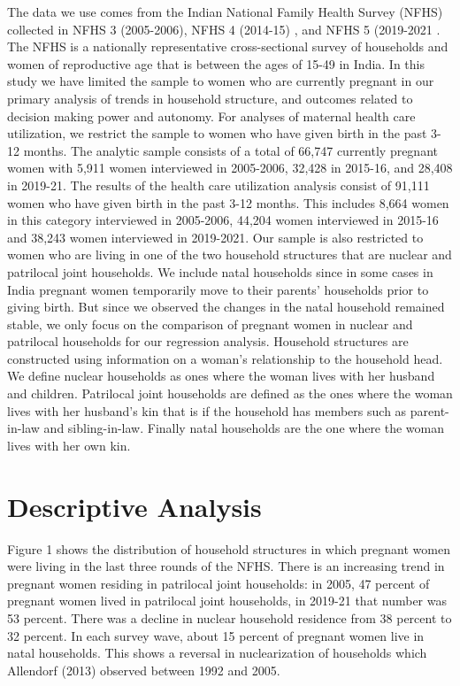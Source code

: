 \documentclass[12pt]{article}
\begin{document}
The data we use comes from the Indian National Family Health Survey (NFHS) collected in NFHS 3 (2005-2006)\cite{IIPS2007NFHS3}, NFHS 4 (2014-15) \cite{IIPS2017NFHS4}, and NFHS 5 (2019-2021 \cite{IIPS2021NFHS5}. The NFHS is a nationally representative cross-sectional survey of households and women of reproductive age that is between the ages of 15-49 in India. In this study we have limited the sample to women who are currently pregnant in our primary analysis of trends in household structure, and outcomes related to decision making power and autonomy. For analyses of maternal health care utilization, we restrict the sample to women who have given birth in the past 3-12 months. The analytic sample consists of a total of 66,747 currently pregnant women with 5,911 women interviewed in 2005-2006, 32,428 in 2015-16, and 28,408 in 2019-21. The results of the health care utilization analysis consist of  91,111 women who have given birth in the past 3-12 months. This includes 8,664 women in this category interviewed in 2005-2006, 44,204 women interviewed in 2015-16 and 38,243 women interviewed in 2019-2021.
Our sample is also restricted to women who are living in one of the two household structures that are nuclear and patrilocal joint households. We include natal households since in some cases in India pregnant women temporarily move to their parents’ households prior to giving birth. But since we observed the changes in the natal household remained stable, we only focus on the comparison of pregnant women in nuclear and patrilocal households for our regression analysis. Household structures are constructed using information on a woman’s relationship to the household head. We define nuclear households as ones where the woman lives with her husband and children. Patrilocal joint households are defined as the ones where the woman lives with her husband’s kin that is if the household has members such as parent-in-law and sibling-in-law. Finally natal households are the one where the woman lives with her own kin. 




\section{Descriptive Analysis}

Figure 1 shows the distribution of household structures in which pregnant women were living in the last three rounds of the NFHS.  There is an increasing trend in pregnant women residing in patrilocal joint households: in 2005, 47 percent of pregnant women lived in patrilocal joint households, in 2019-21 that number was 53 percent. There was a decline in nuclear household residence from 38 percent to 32 percent.  In each survey wave, about 15 percent of pregnant women live in natal households.  This shows a reversal in nuclearization of households which Allendorf (2013) observed between 1992 and 2005.
\end{document}
